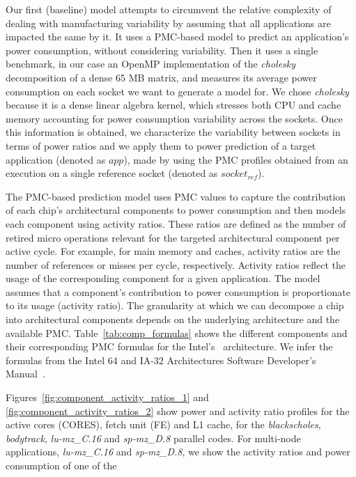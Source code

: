 \par
Our first (baseline) model attempts to circumvent the relative complexity of dealing with
manufacturing variability by assuming that all applications are impacted the same by it.
It uses a PMC-based model to predict an application's power consumption, without
considering variability.  Then it uses a single benchmark, in our case an OpenMP
implementation of the \textit{cholesky} decomposition of a dense 65 MB matrix, and
measures its average power consumption on each socket we want to generate a model for.  We
chose \textit{cholesky} because it is a dense linear algebra kernel, which stresses both
CPU and cache memory accounting for power consumption variability across the sockets.
Once this information is obtained, we characterize the variability between sockets in
terms of power ratios and we apply them to power prediction of a target application
(denoted as $app$), made by using the PMC profiles obtained from an execution on a single
reference socket (denoted as $socket_{ref}$).
\par
The PMC-based prediction model uses PMC values to capture the contribution of each chip's
architectural components to power consumption and then models each component using
activity ratios.  These ratios are defined as the number of retired micro operations
relevant for the targeted architectural component per active cycle.  For example, for main
memory and caches, activity ratios are the number of references or misses per cycle,
respectively.  Activity ratios reflect the usage of the corresponding component for a
given application.  The model assumes that a component's contribution to power consumption
is proportionate to its usage (activity ratio).  The granularity at which we can decompose
a chip into architectural components depends on the underlying architecture and the
available PMC.    Table~\ref{tab:comp_formulas} shows the different components and their
corresponding PMC formulas for the Intel's \ARCH~architecture.  We infer the formulas from
the Intel 64 and IA-32 Architectures Software Developer's
Manual~\cite{fquesnel:progguide:intel10}.
\par
Figures~\ref{fig:component_activity_ratios_1} and \ref{fig:component_activity_ratios_2}
show power and activity ratio profiles for the active cores (CORES), fetch unit (FE) and
L1 cache, for the \textit{blackscholes}, \textit{bodytrack}, \textit{lu-mz\_C.16} and
\textit{sp-mz\_D.8} parallel codes.  For multi-node applications, \textit{lu-mz\_C.16} and
\textit{sp-mz\_D.8}, we show the activity ratios and power consumption of one of the
